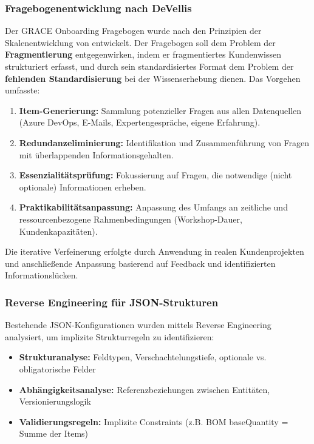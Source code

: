 \subsubsection{Fragebogenentwicklung nach DeVellis}
\label{subsubsec:Fragebogenentwicklung}

Der GRACE Onboarding Fragebogen wurde nach den Prinzipien der Skalenentwicklung von \cite{devellis:scale_development2017} entwickelt. Der Fragebogen soll dem Problem der \textbf{Fragmentierung} entgegenwirken, indem er fragmentiertes Kundenwissen strukturiert erfasst, und durch sein standardisiertes Format dem Problem der \textbf{fehlenden Standardisierung} bei der Wissenserhebung dienen. Das Vorgehen umfasste:

\begin{enumerate}
    \item \textbf{Item-Generierung:} Sammlung potenzieller Fragen aus allen Datenquellen (Azure DevOps, E-Mails, Expertengespräche, eigene Erfahrung).

    \item \textbf{Redundanzeliminierung:} Identifikation und Zusammenführung von Fragen mit überlappenden Informationsgehalten.

    \item \textbf{Essenzialitätsprüfung:} Fokussierung auf Fragen, die notwendige (nicht optionale) Informationen erheben.

    \item \textbf{Praktikabilitätsanpassung:} Anpassung des Umfangs an zeitliche und ressourcenbezogene Rahmenbedingungen (Workshop-Dauer, Kundenkapazitäten).
\end{enumerate}

Die iterative Verfeinerung erfolgte durch Anwendung in realen Kundenprojekten und anschließende Anpassung basierend auf Feedback und identifizierten Informationslücken.

\subsubsection{Reverse Engineering für JSON-Strukturen}
\label{subsubsec:ReverseEngineering}

Bestehende JSON-Konfigurationen wurden mittels Reverse Engineering analysiert, um implizite Strukturregeln zu identifizieren:

\begin{itemize}
    \item \textbf{Strukturanalyse:} Feldtypen, Verschachtelungstiefe, optionale vs. obligatorische Felder
    \item \textbf{Abhängigkeitsanalyse:} Referenzbeziehungen zwischen Entitäten, Versionierungslogik
    \item \textbf{Validierungsregeln:} Implizite Constraints (z.B. BOM baseQuantity = Summe der Items)
\end{itemize}

